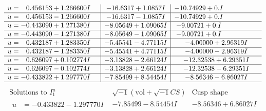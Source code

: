 \documentclass[1p]{elsarticle_modified}
\theoremstyle{definition}
\newcommand{\I}{\sqrt{-1}}
\begin{document}
$$\begin{array}{c|c|c}
\begin{aligned}
u &= \phantom{-}0.456153 + 1.266600 I\end{aligned}
 & -16.6317 + 1.0857 I & -10.74929 + 0. I\phantom{ +0.000000I} \\ \hline\begin{aligned}
u &= \phantom{-}0.456153 - 1.266600 I\end{aligned}
 & -16.6317 - 1.0857 I & -10.74929 + 0. I\phantom{ +0.000000I} \\ \hline\begin{aligned}
u &= -0.443090 + 1.271380 I\end{aligned}
 & -8.05649 + 1.09065 I & -9.00721 + 0. I\phantom{ +0.000000I} \\ \hline\begin{aligned}
u &= -0.443090 - 1.271380 I\end{aligned}
 & -8.05649 - 1.09065 I & -9.00721 + 0. I\phantom{ +0.000000I} \\ \hline\begin{aligned}
u &= \phantom{-}0.432187 + 1.283350 I\end{aligned}
 & -5.45541 - 4.77115 I & -4.00000 + 2.96319 I \\ \hline\begin{aligned}
u &= \phantom{-}0.432187 - 1.283350 I\end{aligned}
 & -5.45541 + 4.77115 I & -4.00000 - 2.96319 I \\ \hline\begin{aligned}
u &= \phantom{-}0.626097 + 0.102774 I\end{aligned}
 & -3.13828 - 2.66124 I & -12.32538 + 6.29351 I \\ \hline\begin{aligned}
u &= \phantom{-}0.626097 - 0.102774 I\end{aligned}
 & -3.13828 + 2.66124 I & -12.32538 - 6.29351 I \\ \hline\begin{aligned}
u &= -0.433822 + 1.297770 I\end{aligned}
 & -7.85499 + 8.54454 I & -8.56346 - 6.86027 I\\
 \hline 
 \end{array}$$\newpage$$\begin{array}{c|c|c}  
\text{Solutions to }I^u_{1}& \I (\text{vol} + \sqrt{-1}CS) & \text{Cusp shape}\\
 \hline 
\begin{aligned}
u &= -0.433822 - 1.297770 I\end{aligned}
 & -7.85499 - 8.54454 I & -8.56346 + 6.86027 I \\ \hline\begin{aligned}

\end{aligned}
\end{array}$$
\end{document}
